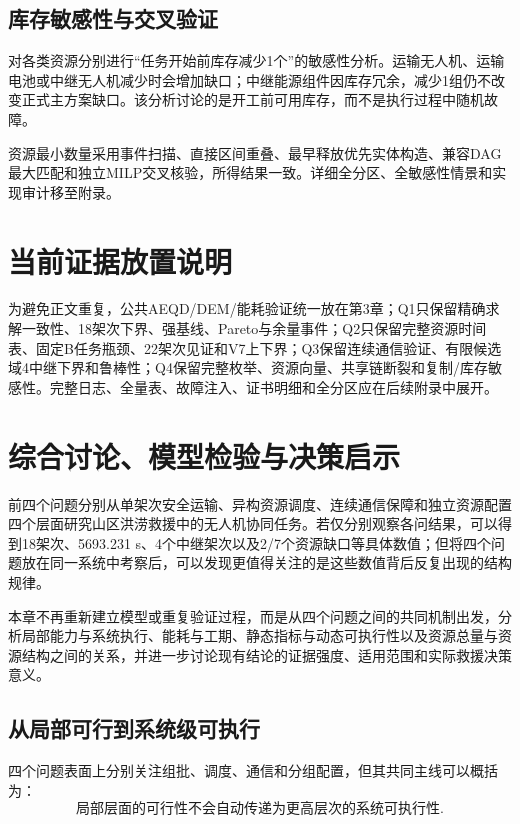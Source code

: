 \documentclass[UTF8,a4paper,12pt]{ctexart}
\begin{document}
\subsection{库存敏感性与交叉验证}

对各类资源分别进行“任务开始前库存减少1个”的敏感性分析。运输无人机、运输电池或中继无人机减少时会增加缺口；中继能源组件因库存冗余，减少1组仍不改变正式主方案缺口。该分析讨论的是开工前可用库存，而不是执行过程中随机故障。

资源最小数量采用事件扫描、直接区间重叠、最早释放优先实体构造、兼容DAG最大匹配和独立MILP交叉核验，所得结果一致。详细全分区、全敏感性情景和实现审计移至附录。

\section*{当前证据放置说明}

为避免正文重复，公共AEQD/DEM/能耗验证统一放在第3章；Q1只保留精确求解一致性、18架次下界、强基线、Pareto与余量事件；Q2只保留完整资源时间表、固定B任务瓶颈、22架次见证和V7上下界；Q3保留连续通信验证、有限候选域4中继下界和鲁棒性；Q4保留完整枚举、资源向量、共享链断裂和复制/库存敏感性。完整日志、全量表、故障注入、证书明细和全分区应在后续附录中展开。


\section{综合讨论、模型检验与决策启示}
\label{sec:discussion}

前四个问题分别从单架次安全运输、异构资源调度、连续通信保障和独立资源配置四个层面研究山区洪涝救援中的无人机协同任务。若仅分别观察各问结果，可以得到18架次、5693.231 s、4个中继架次以及2/7个资源缺口等具体数值；但将四个问题放在同一系统中考察后，可以发现更值得关注的是这些数值背后反复出现的结构规律。

本章不再重新建立模型或重复验证过程，而是从四个问题之间的共同机制出发，分析局部能力与系统执行、能耗与工期、静态指标与动态可执行性以及资源总量与资源结构之间的关系，并进一步讨论现有结论的证据强度、适用范围和实际救援决策意义。

\subsection{从局部可行到系统级可执行}

四个问题表面上分别关注组批、调度、通信和分组配置，但其共同主线可以概括为：
\[
\boxed{
\text{局部层面的可行性不会自动传递为更高层次的系统可执行性}
}.
\]
\end{document}
